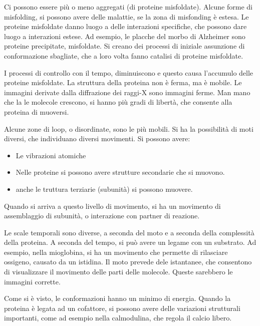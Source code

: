 Ci possono essere più o meno aggregati (di proteine misfoldate). Alcune
forme di misfolding, si possono avere delle malattie, se la zona di
misfonding è estesa. Le proteine misfoldate danno
luogo a delle interazioni specifiche, che possono dare luogo a
interazioni estese.
Ad esempio, le placche del morbo di Alzheimer sono proteine precipitate, misfoldate.
Si creano dei processi di iniziale assunzione di conformazione
sbagliate, che a loro volta fanno catalisi di proteine misfoldate.


I processi di controllo con il tempo, diminuiscono e questo causa
l'accumulo delle proteine misfoldate.
La struttura della proteina non è ferma, ma è mobile. Le immagini
derivate dalla diffrazione dei raggi-X sono immagini ferme. Man mano che
la le molecole crescono, si hanno più gradi di libertà, che consente
alla proteina di muoversi.

Alcune zone di loop, o disordinate, sono le più mobili. Si ha la
possibilità di moti diversi, che individuano diversi movimenti.
Si possono avere:
\begin{itemize}
  \item Le vibrazioni atomiche
  \item Nelle proteine si possono avere strutture secondarie che si muovono. 
  \item anche le truttura terziarie (subunità) si possono muovere.
\end{itemize}
Quando si arriva a questo livello di movimento, si ha un movimento di
assemblaggio di subunità, o interazione con partner di reazione.

Le scale temporali sono diverse, a seconda del moto e a seconda della
complessità della proteina. A seconda del tempo, si può avere un legame
con un substrato.
Ad esempio, nella mioglobina, si ha un movimento che permette di
rilasciare ossigeno, causato da un istidina. Il moto prevede dele
istantanee, che consentono di visualizzare il movimento delle parti
delle molecole. Queste sarebbero le immagini corrette.

Come si è visto, le conformazioni hanno un minimo di energia. Quando la
proteina è legata ad un cofattore, si possono avere delle variazioni
strutturali importanti, come ad esempio nella calmodulina, che regola il
calcio libero.

